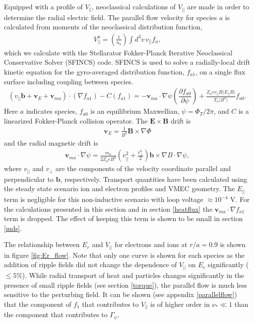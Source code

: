 \documentclass{article}
\numberwithin{figure}{section}
\numberwithin{equation}{section}
\newcommand{\partder}[2]{\dfrac{\partial  #1}{\partial  #2}} %
\begin{document}
Equipped with a profile of $V_{\zeta}$, neoclassical calculations of $V_{||}$ are made in order to determine the radial electric field. The parallel flow velocity for species $a$ is calculated from moments of the neoclassical distribution function,
\begin{gather}
V^a_{||} = \left(\frac{1}{n_a}\right) \int d^3 v \, v_{||} f_a,
\label{eq:parallelflow}
\end{gather}
which we calculate with the Stellarator Fokker-Planck Iterative Neoclassical Conservative Solver (SFINCS) \cite{Landreman2014} code.
SFINCS is used to solve a radially-local drift kinetic equation for the gyro-averaged distribution function, $f_{a1}$, on a single flux surface including coupling between species. 
\begin{gather}
( v_{||} \bm{b} + \bm{v}_E + \bm{v}_{ma}) \cdot (\nabla f_{a1})  - C(f_{a1}) = - \bm{v}_{ma} \cdot \nabla \psi \left( \partder{f_{a0}}{\psi} \right) + \frac{Z_a e v_{||} B \langle E_{||} B \rangle}{T_a \langle B^2 \rangle } f_{a0}.
\label{kineticequation}
\end{gather} 
\hspace{-1mm}
Here $a$ indicates species, $f_{a0}$ is an equilibrium Maxwellian, $\psi = \Phi_T/2\pi$, and $C$ is a linearized Fokker-Planck collision operator. The $\bm{E} \times \bm{B}$ drift is 
\begin{gather}
\bm{v}_E = \frac{1}{B^2} \bm{B} \times \nabla \Phi
\end{gather} 
and the radial magnetic drift is
\begin{gather}
\bm{v}_{ma} \cdot \nabla \psi = \frac{m_a }{2Z_a e B^2} \left(v_{||}^2 + \frac{v_{\perp}^2}{2} \right) \bm{b} \times \nabla B \cdot \nabla \psi,
\label{magneticdrift}
\end{gather} 
where $v_{||}$ and $v_{\perp}$ are the components of the velocity coordinate parallel and perpendicular to $\bm{b}$, respectively. Transport quantities have been calculated using the steady state scenario ion and electron profiles and VMEC geometry. The $E_{||}$ term is negligible for this non-inductive scenario with loop voltage $ \approx 10^{-4}$ V. For the calculations presented in this section and in section \ref{heatflux} the $\bm{v}_{ma} \cdot \nabla f_{a1}$ term is dropped. The effect of keeping this term is shown to be small in section \ref{mds}.

The relationship between $E_r$ and $V_{||}$ for electrons and ions at $r/a = 0.9$ is shown in figure \ref{fig:Er_flow}. Note that only one curve is shown for each species as the addition of ripple fields did not change the dependence of $V_{||}$ on $E_r$ significantly ($\leq 5 \%$). While radial transport of heat and particles changes significantly in the presence of small ripple fields (see section \ref{torque}), the parallel flow is much less sensitive to the perturbing field. It can be shown (see appendix \ref{parallelflow}) that the component of $f_1$ that contributes to $V_{||}$ is of higher order in $\nu_* \ll 1 $ than the component that contributes to $\Gamma_{\psi}$. 
\end{document}
